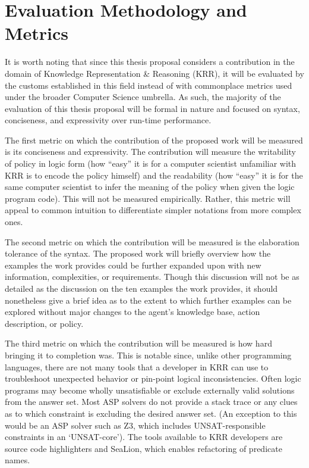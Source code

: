 \section{Evaluation Methodology and Metrics}

It is worth noting that since this thesis proposal considers a contribution in the domain of Knowledge Representation \& Reasoning (KRR), it will be evaluated by the customs established in this field instead of with commonplace metrics used under the broader Computer Science umbrella.
As such, the majority of the evaluation of this thesis proposal will be formal in nature and focused on syntax, conciseness, and expressivity over run-time performance.

The first metric on which the contribution of the proposed work will be measured is its conciseness and expressivity.
The contribution will measure the writability of policy in logic form (how ``easy'' it is for a computer scientist unfamiliar with KRR is to encode the policy himself) and the readability (how ``easy'' it is for the same computer scientist to infer the meaning of the policy when given the logic program code).
This will not be measured empirically.
Rather, this metric will appeal to common intuition to differentiate simpler notations from more complex ones.

The second metric on which the contribution will be measured is the elaboration tolerance of the syntax.
The proposed work will briefly overview how the examples the work provides could be further expanded upon with new information, complexities, or requirements.
Though this discussion will not be as detailed as the discussion on the ten examples the work provides, it should nonetheless give a brief idea as to the extent to which further examples can be explored without major changes to the agent's knowledge base, action description, or policy.

The third metric on which the contribution will be measured is how hard bringing it to completion was.
This is notable since, unlike other programming languages, there are not many tools that a developer in KRR can use to troubleshoot unexpected behavior or pin-point logical inconsistencies.
Often logic programs may become wholly unsatisfiable or exclude externally valid solutions from the answer set.
Most ASP solvers do not provide a stack trace or any clues as to which constraint is excluding the desired answer set.
(An exception to this would be an ASP solver such as Z3, which includes UNSAT-responsible constraints in an `UNSAT-core').
The tools available to KRR developers are source code highlighters and SeaLion, which enables refactoring of predicate names.

